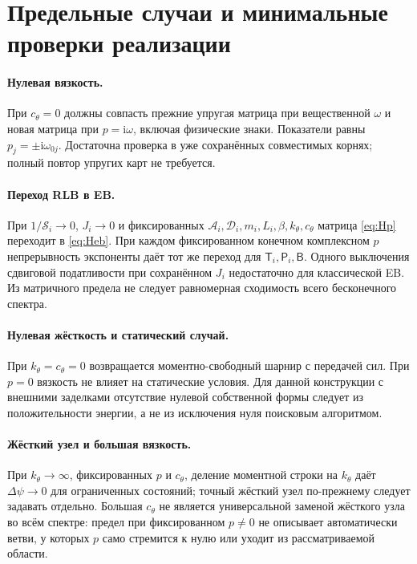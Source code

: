 \documentclass[11pt,a4paper]{article}
\numberwithin{equation}{section}
\newcommand{\ii}{\mathrm i}
\newcommand{\A}{\mathcal A}
\newcommand{\D}{\mathcal D}
\newcommand{\Sbeam}{\mathcal S}
\newcommand{\kth}{k_\theta}
\newcommand{\cth}{c_\theta}
\newcommand{\BB}{\mathsf B}
\newcommand{\TT}{\mathsf T}
\newcommand{\PP}{\mathsf P}
\begin{document}
\section{Предельные случаи и минимальные проверки реализации}
\label{sec:limits}

\paragraph{Нулевая вязкость.}
При $\cth=0$ должны совпасть прежние упругая матрица при вещественной
$\omega$ и новая матрица при $p=\ii\omega$, включая физические знаки.
Показатели равны $p_j=\pm\ii\omega_{0j}$. Достаточна проверка в уже
сохранённых совместимых корнях; полный повтор упругих карт не требуется.

\paragraph{Переход RLB в EB.}
При $1/\Sbeam_i\to0$, $J_i\to0$ и фиксированных
$\A_i,\D_i,m_i,L_i,\beta,\kth,\cth$ матрица \eqref{eq:Hp} переходит в
\eqref{eq:Heb}. При каждом фиксированном конечном комплексном $p$
непрерывность экспоненты даёт тот же переход для $\TT_i,\PP_i,\BB$.
Одного выключения сдвиговой податливости при сохранённом $J_i$
недостаточно для классической EB. Из матричного предела не следует
равномерная сходимость всего бесконечного спектра.

\paragraph{Нулевая жёсткость и статический случай.}
При $\kth=\cth=0$ возвращается моментно-свободный шарнир с передачей сил.
При $p=0$ вязкость не влияет на статические условия. Для данной конструкции
с внешними заделками отсутствие нулевой собственной формы следует из
положительности энергии, а не из исключения нуля поисковым алгоритмом.

\paragraph{Жёсткий узел и большая вязкость.}
При $\kth\to\infty$, фиксированных $p$ и $\cth$, деление моментной строки
на $\kth$ даёт $\Delta\psi\to0$ для ограниченных состояний; точный
жёсткий узел по-прежнему следует задавать отдельно. Большая $\cth$
не является универсальной заменой жёсткого узла во всём спектре:
предел при фиксированном $p\ne0$ не описывает автоматически ветви,
у которых $p$ само стремится к нулю или уходит из рассматриваемой области.
\end{document}
